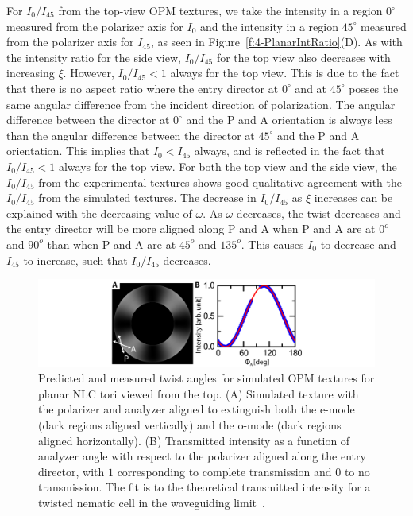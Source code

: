 For $I_0/I_{45}$ from the top-view OPM textures, we take the intensity in a region  $0^{\circ}$ measured from the polarizer axis for $I_0$ and the intensity in a region $45^{\circ}$ measured from the polarizer axis for $I_{45}$, as seen in Figure~\ref{f:4-PlanarIntRatio}(D).
As with the intensity ratio for the side view, $I_0/I_{45}$ for the top view also decreases with increasing $\xi$. However, $I_0/I_{45}<1$ always for the top view.
This is due to the fact that there is no aspect ratio where the entry director at $0^{\circ}$ and at $45^{\circ}$ posses the same angular difference from the incident direction of polarization.
The angular difference between the director at $0^{\circ}$ and the P and A orientation is always less than the angular difference between the director at $45^{\circ}$ and the P and A orientation.
This implies that $I_0 < I_{45}$ always, and is reflected in the fact that $I_0/I_{45}<1$ always for the top view.
For both the top view and the side view, the $I_0/I_{45}$ from the experimental textures shows good qualitative agreement with the $I_0/I_{45}$ from the simulated textures.
The decrease in $I_0/I_{45}$ as $\xi$ increases can be explained with the decreasing value of $\omega$.
As $\omega$ decreases, the twist decreases and the entry director will be more aligned along P and A when P and A are at $0^o$ and $90^o$ than when P and A are at $45^o$ and $135^o$.
This causes $I_0$ to decrease and $I_{45}$ to increase, such that $I_0/I_{45}$ decreases.
\begin{figure}
\centering
\includegraphics{figures/C4/Ch4-Figs_MeasuredTwist.png}
\caption{Predicted and measured twist angles for simulated OPM textures for planar NLC tori viewed from the top.
(A) Simulated texture with the polarizer and analyzer aligned to extinguish both the e-mode (dark regions aligned vertically) and the o-mode (dark regions aligned horizontally).
(B) Transmitted intensity as a function of analyzer angle with respect to the polarizer aligned along the entry director, with $1$ corresponding to complete transmission and $0$ to no transmission.
The fit is to the theoretical transmitted intensity for a twisted nematic cell in the waveguiding limit~\cite{RN232}.}\label{f:4-PlanarTwist}
\end{figure}

